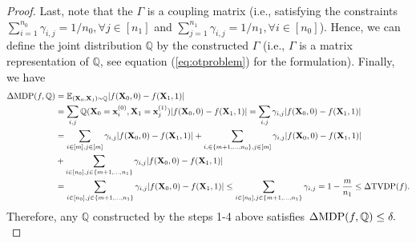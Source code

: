 \documentclass[10pt]{article} %
\begin{document}
\begin{proof}
            Last, note that the $\Gamma$ is a coupling matrix (i.e., satisfying the constraints $\sum_{i = 1}^{n_{0}} \gamma_{i, j} = 1/n_{0}, \forall j \in [n_{1}]$ and $\sum_{j = 1}^{n_{1}} \gamma_{i, j} = 1/n_{1}, \forall i \in [n_{0}]$).
            Hence, we can define the joint distribution $\mathbb{Q}$ by the constructed $\Gamma$ (i.e., $\Gamma$ is a matrix representation of $\mathbb{Q}$, see equation (\ref{eq:otproblem}) for the formulation).
            Finally, we have
            \begin{equation}
                \begin{split}
                    \Delta \textup{MDP}(f, \mathbb{Q})
                    & = \mathbb{E}_{(\mathbf{X}_{0}, \mathbf{X}_{1}) \sim \mathbb{Q}} \vert f(\mathbf{X}_{0}, 0) - f(\mathbf{X}_{1}, 1) \vert
                    \\
                    & = \sum_{i, j} \mathbb{Q}(\mathbf{X}_{0} = \mathbf{x}_{i}^{(0)}, \mathbf{X}_{1} = \mathbf{x}_{j}^{(1)})
                    \vert f(\mathbf{X}_{0}, 0) - f(\mathbf{X}_{1}, 1) \vert
                    = \sum_{i, j} \gamma_{i, j} \vert f(\mathbf{X}_{0}, 0) - f(\mathbf{X}_{1}, 1) \vert
                    \\
                    & = \sum_{i \in [m], j \in [m]} \gamma_{i, j} \vert f(\mathbf{X}_{0}, 0) - f(\mathbf{X}_{1}, 1) \vert
                    + \sum_{i, \in \{m+1, \ldots, n_{0}\}, j \in [m]} \gamma_{i, j} \vert f(\mathbf{X}_{0}, 0) - f(\mathbf{X}_{1}, 1) \vert
                    \\
                    & + \sum_{i \in [n_{0}], j \in \{m+1, \ldots, n_{1}\}} \gamma_{i, j} \vert f(\mathbf{X}_{0}, 0) - f(\mathbf{X}_{1}, 1) \vert
                    \\
                    & = \sum_{i \in [n_{0}], j \in \{m+1, \ldots, n_{1}\}} \gamma_{i, j} \vert f(\mathbf{X}_{0}, 0) - f(\mathbf{X}_{1}, 1) \vert
                    \le \sum_{i \in [n_{0}], j \in \{m+1, \ldots, n_{1}\}} \gamma_{i, j} = 1 - \frac{m}{n_{1}}
                    \le \Delta \textup{TVDP}(f).
                \end{split}
            \end{equation}            
            Therefore, any $\mathbb{Q}$ constructed by the steps 1-4 above satisfies $\Delta \textup{MDP}(f, \mathbb{Q}) \le \delta.$
        \end{proof}

       
        
\end{document}
